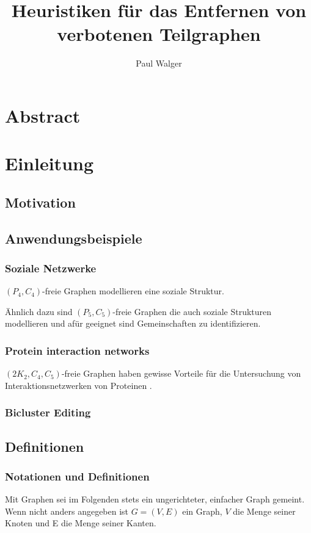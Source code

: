 \documentclass[12pt,a4paper,onecolumn,oneside,titlepage]{article}
\author{Paul Walger}
\title{Heuristiken für das Entfernen von verbotenen Teilgraphen}
\begin{document}
\maketitle
\tableofcontents
\newpage

\section{Abstract}

\section{Einleitung}


\subsection{Motivation}


\subsection{Anwendungsbeispiele}

\subsubsection{Soziale Netzwerke}
$(P_4,C_4)$-freie Graphen modellieren eine soziale Struktur. \cite{NastosG13}

Ähnlich dazu sind $(P_5,C_5)$-freie Graphen die auch soziale Strukturen modellieren und afür geeignet sind Gemeinschaften zu identifizieren. \cite{Schoch15}

\subsubsection{Protein interaction networks}
$(2K_2, C_4, C_5)$-freie Graphen haben gewisse Vorteile für die Untersuchung von Interaktionsnetzwerken von Proteinen \cite{BrucknerHK15}.

\subsubsection{Bicluster Editing}
\cite{De12} \cite{Madeira04} 

\subsection{Definitionen}
\subsubsection{Notationen und Definitionen}
Mit Graphen sei im Folgenden stets ein ungerichteter, einfacher Graph gemeint. Wenn nicht anders angegeben ist $G=(V,E)$ ein Graph, $V$ die Menge seiner Knoten und E die Menge seiner Kanten.
\end{document}
